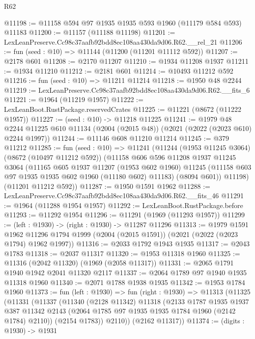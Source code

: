 \begin{lexlean}{R62}
\begin{coremodule}
@11198 := @11158 @594 @97 @1935 @1935 @593 @1960 (@11179 @584 @593) @11183
@11200 := @11157 (@11188 @11198)
@11201 := LexLeanPreserve.Cc98c37aafb92bdd8ec108aa430da9d06.R62.__rel_21
@11206 := fun (seed : @10) => @11144 (@11200 (@11201 @11112 @592))
@11207 := @2178 @601
@11208 := @2170 @11207
@11210 := @1934 @11208 @1937
@11211 := @1934 @11210
@11212 := @2181 @601
@11214 := @10493 @11212 @592
@11216 := fun (seed : @10) => @11211 @11214
@11218 := @1950 @48 @2244
@11219 := LexLeanPreserve.Cc98c37aafb92bdd8ec108aa430da9d06.R62.__fits_6
@11221 := @1964 (@11219 @1957)
@11222 := LexLeanBoot.RustPackage.reservedCrates
@11225 := @11221 (@8672 (@11222 @1957))
@11227 := (seed : @10) -> @11218 @11225
@11241 := @1979
    @48
    @2244
    @11225
    @610
    @11134
    (@2004 (@2015 @48))
    (@2021 (@2022 (@2023 @610) @2244 @1997))
@11244 := @11146 @608 @11210 @11214
@11245 := @379 @11212
@11285 := fun (seed : @10) =>
  @11241
    (@11244
      (@1953 @11245 @3064)
      (@8672 (@10497 @11212 @592))
      (@11158
        @606
        @596
        @11208
        @1937
        @11245
        @3064
        (@11165
          @605
          @1937
          @11207
          (@1953 @602 @1960)
          @11245
          (@11158 @603 @97 @1935 @1935 @602 @1960 (@11180 @602) @11183)
          (@8094 @601))
        @11198)
      (@11201 @11212 @592))
@11287 := @1950 @1591 @1962
@11288 := LexLeanPreserve.Cc98c37aafb92bdd8ec108aa430da9d06.R62.__fits_46
@11291 := @1964 (@11288 @1954 @1957)
@11292 := LexLeanBoot.RustPackage.before
@11293 := @11292 @1954
@11296 := @11291 (@1969 (@11293 @1957))
@11299 := (left : @1930) -> (right : @1930) -> @11287 @11296
@11313 := @1979
    @1591
    @1962
    @11296
    @1794
    @1999
    (@2004 (@2015 @1591))
    (@2021 (@2022 (@2023 @1794) @1962 @1997))
@11316 := @2033 @1792 @1943 @1935
@11317 := @2043 @1783
@11318 := @2037 @11317
@11320 := @1953 @11318 @1960
@11325 := @11316 (@2042 @11320) (@1969 (@2058 @11317))
@11331 := @2065 @1791 @1940 @1942 @2041 @11320 @2117
@11337 := @2064 @1789 @97 @1940 @1935 @11318 @1960
@11340 := @2071 @1788 @1938 @1935
@11342 := @1953 @1784 @1960
@11373 := fun (left : @1930) =>
  fun (right : @1930) =>
  @11313
    (@11325
      (@11331
        (@11337
          (@11340
            (@2128 @11342)
            @11318
            (@2133
              @1787
              @1935
              @1937
              @387
              @11342
              @2143
              (@2064 @1785 @97 @1935 @1935 @1784 @1960 (@2142 @1784) @2110))
            (@2154 @1783))
          @2110))
      (@2162 @11317))
@11374 := (digits : @1930) -> @1931

\end{coremodule}
\end{lexlean}
